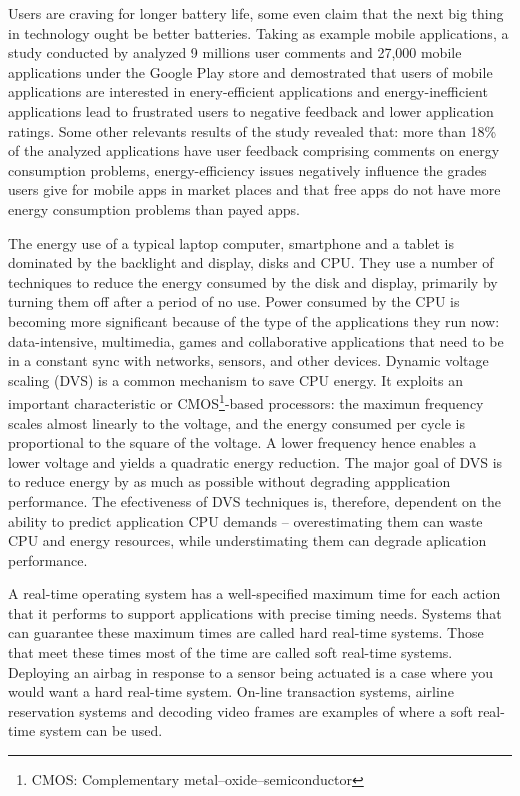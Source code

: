 \documentclass[10pt,article]{IEEEtran}
\begin{document}
Users are craving for longer battery life, some even claim that the next big thing in technology ought be better batteries\cite{moren}. Taking as example mobile applications, a study conducted by \cite{wilke-et-al} analyzed 9 millions user comments and 27,000 mobile applications under the Google Play store and demostrated that users of mobile applications are interested in enery-efficient applications and energy-inefficient applications lead to frustrated users to negative feedback and lower application ratings. Some other relevants results of the study revealed that: more than 18\% of the analyzed applications have user feedback comprising comments on energy consumption problems, energy-efficiency issues negatively influence the grades users give for mobile apps in market places and that free apps do not have more energy consumption problems than payed apps. 

The energy use of a typical laptop computer, smartphone and a tablet is dominated by the backlight and display, disks and CPU. They use a number of techniques to reduce the energy consumed by the disk and display, primarily by turning them off after a period of no use. Power consumed by the CPU is becoming more significant because of the type of the applications they run now: data-intensive, multimedia, games and collaborative applications that need to be in a constant sync with networks, sensors, and other devices. Dynamic voltage scaling (DVS) is a common mechanism to save CPU energy. It exploits an important characteristic or CMOS\footnote{CMOS: Complementary metal–oxide–semiconductor}-based processors: the maximun frequency scales almost linearly to the voltage, and the energy consumed per cycle is proportional to the square of the voltage. A lower frequency hence enables a lower voltage and yields a quadratic energy reduction\cite{chandrakasan}. The major goal of DVS is to reduce energy by as much as possible without degrading appplication performance. The efectiveness of DVS techniques is, therefore, dependent on the ability to predict application CPU demands -- overestimating them can waste CPU and energy resources, while understimating them can degrade aplication performance\cite{yuan-nahrstedt}.

A real-time operating system has a well-specified maximum time for each action that it performs to support applications with precise timing needs. Systems that can guarantee these maximum times are called hard real-time systems. Those that meet these times most of the time are called soft real-time systems. Deploying an airbag in response to a sensor being actuated is a case where you would want a hard real-time system. On-line transaction systems, airline reservation systems and decoding video frames are examples of where a soft real-time system can be used.
\end{document}
